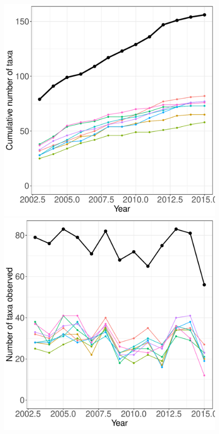 \documentclass[11pt, oneside]{article}
\begin{document}
\begin{figure}[h!]
\centering
\includegraphics[scale = 0.4]{sev-plants-compagnoni_species_accumulation_curve.pdf}
\includegraphics[scale = 0.4]{sev-plants-compagnoni_num_taxa_over_time.pdf}

\end{figure}
\end{document}
